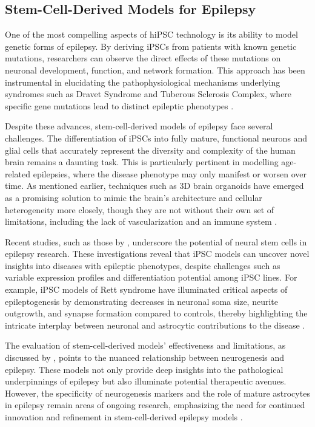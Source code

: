 \documentclass[10pt]{article}
\begin{document}
\begin{sloppypar}
  \subsection{Stem-Cell-Derived Models for Epilepsy}
  \label{sec:stem-cell-derived-models-for-epilepsy}

  One of the most compelling aspects of hiPSC technology is its ability to model genetic forms of epilepsy. By deriving iPSCs from patients with known genetic mutations, researchers can observe the direct effects of these mutations on neuronal development, function, and network formation. This approach has been instrumental in elucidating the pathophysiological mechanisms underlying syndromes such as Dravet Syndrome and Tuberous Sclerosis Complex, where specific gene mutations lead to distinct epileptic phenotypes \citep{jiao_modeling_2013, nadadhur_neuron-glia_2019}.

  Despite these advances, stem-cell-derived models of epilepsy face several challenges. The differentiation of iPSCs into fully mature, functional neurons and glial cells that accurately represent the diversity and complexity of the human brain remains a daunting task. This is particularly pertinent in modelling age-related epilepsies, where the disease phenotype may only manifest or worsen over time. As mentioned earlier, techniques such as 3D brain organoids have emerged as a promising solution to mimic the brain's architecture and cellular heterogeneity more closely, though they are not without their own set of limitations, including the lack of vascularization and an immune system \citep{lancaster_cerebral_2013, di_lullo_use_2017}.

  Recent studies, such as those by \citeauthor{thodeson_neural_2017} \citeyearpar{thodeson_neural_2017}, underscore the potential of neural stem cells in epilepsy research. These investigations reveal that iPSC models can uncover novel insights into diseases with epileptic phenotypes, despite challenges such as variable expression profiles and differentiation potential among iPSC lines. For example, iPSC models of Rett syndrome have illuminated critical aspects of epileptogenesis by demonstrating decreases in neuronal soma size, neurite outgrowth, and synapse formation compared to controls, thereby highlighting the intricate interplay between neuronal and astrocytic contributions to the disease \citep{marchetto_model_2010}.

  The evaluation of stem-cell-derived models' effectiveness and limitations, as discussed by \citeauthor{kandemir_investigation_2022} \citeyearpar{kandemir_investigation_2022}, points to the nuanced relationship between neurogenesis and epilepsy. These models not only provide deep insights into the pathological underpinnings of epilepsy but also illuminate potential therapeutic avenues. However, the specificity of neurogenesis markers and the role of mature astrocytes in epilepsy remain areas of ongoing research, emphasizing the need for continued innovation and refinement in stem-cell-derived epilepsy models \citep{jessberger_epilepsy_2015}.


\end{sloppypar}
\end{document}
